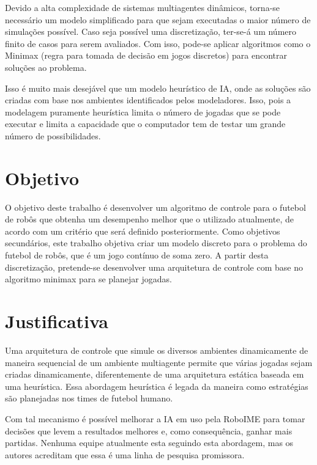 Devido a alta complexidade de sistemas multiagentes dinâmicos, torna-se
necessário um modelo simplificado para que sejam executadas o maior número de
simulações possível.  Caso seja possível uma discretização, ter-se-á um número
finito de casos para serem avaliados. Com isso, pode-se aplicar algoritmos como
o Minimax (regra para tomada de decisão em jogos discretos) para encontrar
soluções ao problema.

Isso é muito mais desejável que um modelo heurístico de IA, onde as soluções são
criadas com base nos ambientes identificados pelos modeladores. Isso, pois a
modelagem puramente heurística limita o número de jogadas que se pode executar e
limita a capacidade que o computador tem de testar um grande número de possibilidades.

\section{Objetivo}

O objetivo deste trabalho é desenvolver um algoritmo de controle para o futebol
de robôs que obtenha um desempenho melhor que o utilizado atualmente, de acordo
com um critério que será definido posteriormente.
Como objetivos secundários, este trabalho objetiva criar um modelo discreto para
o problema do futebol de robôs, que é um jogo contínuo de soma zero.
A partir desta discretização, pretende-se desenvolver uma arquitetura de
controle com base no algoritmo minimax para se planejar jogadas.

\section{Justificativa}

Uma arquitetura de controle que simule os diversos ambientes dinamicamente de
maneira sequencial de um ambiente multiagente permite que várias jogadas sejam
criadas dinamicamente, diferentemente de uma arquitetura estática baseada em uma
heurística. Essa abordagem heurística é legada da maneira como estratégias são
planejadas nos times de futebol humano.

Com tal mecanismo é possível melhorar a IA em uso pela RoboIME para tomar
decisões que levem a resultados melhores e, como consequência, ganhar mais
partidas. Nenhuma equipe atualmente esta seguindo esta abordagem, mas os autores
acreditam que essa é uma linha de pesquisa promissora.


